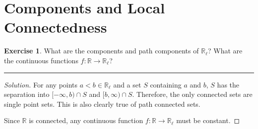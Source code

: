 \documentclass{article}
\theoremstyle{definition}
\newtheorem{exercise}{Exercise}[section]
\begin{document}
\addtocounter{section}{24}
\section{Components and Local Connectedness}

\begin{exercise}
  What are the components and path components of $\mathbb{R}_\ell$? What are the continuous functions $f:\mathbb{R}\to\mathbb{R}_\ell$?
\end{exercise}
\hrule
\begin{proof}[Solution]
  For any points $a<b\in \mathbb{R}_\ell$ and a set $S$ containing $a$ and $b$, $S$ has the separation into $[-\infty,b)\cap S$ and $[b,\infty)\cap S$. Therefore, the only connected sets are single point sets. This is also clearly true of path connected sets.

  Since $\mathbb{R}$ is connected, any continuous function $f:\mathbb{R}\to\mathbb{R}_\ell$ must be constant.
\end{proof}

\pagebreak
\end{document}
